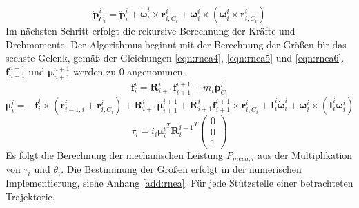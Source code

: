 %
\begin{equation}
	\label{eqn:rnea3}
	\ddot{\bm{p}}^i_{C_i} = \ddot{\bm{p}}^{i}_{i} + \dot{\bm{\omega}}^{i}_{i} \times \bm{r}^{i}_{i,C_i} + {\bm{\omega}}^{i}_{i} \times \left(  {\bm{\omega}}^{i}_{i} \times \bm{r}^{i}_{i,C_i} \right)
\end{equation}
%
Im nächsten Schritt erfolgt die rekursive Berechnung der Kräfte und Drehmomente. Der Algorithmus beginnt mit der Berechnung der Größen für das sechste Gelenk, gemäß der Gleichungen \ref{eqn:rnea4}, \ref{eqn:rnea5} und \ref{eqn:rnea6}. $\bm{f}^{n+1}_{n+1}$ und $\bm{\mu}^{n+1}_{n+1}$ werden zu 0 angenommen. 
%
\begin{equation}
	\label{eqn:rnea4}
	\bm{f}^{i}_{i} = \bm{R}^{i}_{i+1} \bm{f}^{i+1}_{i+1} + m_i\ddot{\bm{p}}^{i}_{C_i}
\end{equation}
%
\begin{equation}
	\label{eqn:rnea5}
	\bm{\mu}^{i}_{i} = -\bm{f}^{i}_{i} \times \left( \bm{r}^{i}_{i-1,i} + \bm{r}^{i}_{i,C_i} \right) + \bm{R}^{i}_{i+1} \bm{\mu}^{i+1}_{i+1} + \bm{R}^{i}_{i+1} \bm{f}^{i+1}_{i+1} \times \bm{r}^{i}_{i,C_i} + \bm{I}^{i}_{i} \dot{\bm{\omega}}^{i}_{i} + {\bm{\omega}}^{i}_{i} \times (\bm{I}^{i}_{i}{\bm{\omega}}^{i}_{i})
\end{equation}
\begin{equation}
	\label{eqn:rnea6}
	\tau_i = i_i{\bm{\mu}^{i}_{i}}^T {\bm{R}^{i-1}_{i}}^T \left(\begin{array}{c} 0 \\ 0 \\ 1 \end{array}\right) 
\end{equation}
%
Es folgt die Berechnung der mechanischen Leistung $P_{mech,i}$ aus der Multiplikation von $\tau_i$ und $\dot{{\theta_i}}$. Die Bestimmung der Größen erfolgt in der numerischen Implementierung, siehe  Anhang \ref{add:rnea}. Für jede Stützstelle einer betrachteten Trajektorie. 

